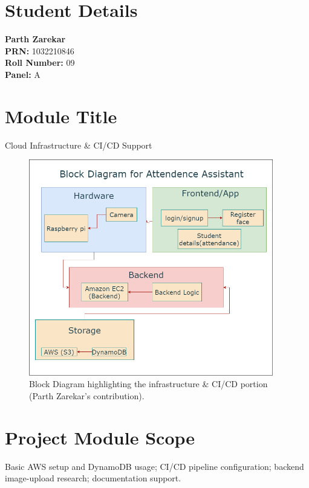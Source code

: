\documentclass[openany]{report}
\begin{document}
\section{Student Details}
\textbf{Parth Zarekar} \\
\textbf{PRN:} 1032210846 \\
\textbf{Roll Number:} 09 \\
\textbf{Panel:} A \\

\section{Module Title}
Cloud Infrastructure \& CI/CD Support

\begin{figure}[H]
  \centering
  \includegraphics[width=0.95\textwidth]{../imgs/block diagram.png}
  \caption{Block Diagram highlighting the infrastructure \& CI/CD portion (Parth Zarekar’s contribution).}
  \label{fig:block_diagram_parth}
\end{figure}

\section{Project Module Scope}
Basic AWS setup and DynamoDB usage; CI/CD pipeline configuration; backend image-upload research; documentation support.
\end{document}
